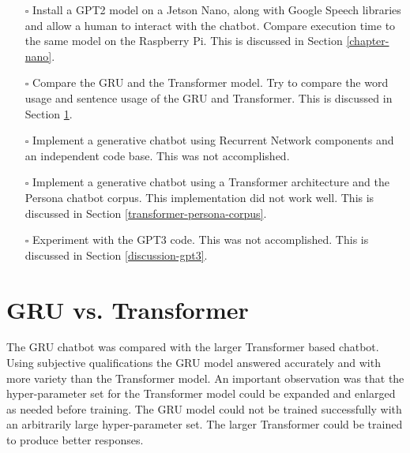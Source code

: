 \begin{itemize}
	\item[\rlap{\raisebox{0.3ex}{\hspace{0.4ex}\tiny \ding{52}}}$\square$] Install a GPT2 model on a Jetson Nano, along with Google Speech libraries and allow a human to interact with the chatbot. Compare execution time to the same model on the Raspberry Pi. This is discussed in Section \ref{chapter-nano}.
	
	\item[\rlap{\raisebox{0.3ex}{\hspace{0.4ex}\tiny \ding{52}}}$\square$] Compare the GRU and the Transformer model. Try to compare the word usage and sentence usage of the GRU and Transformer. This is discussed in Section \ref{gru-vs-transformer}.
	
	\item[\rlap{\raisebox{0.3ex}{\hspace{0.4ex}\scriptsize \ding{56}}}$\square$] Implement a generative chatbot using Recurrent Network components and an independent code base. This was not accomplished.
	
	\item[\rlap{\raisebox{0.3ex}{\hspace{0.4ex}\scriptsize \ding{56}}}$\square$] Implement a generative chatbot using a Transformer architecture and the Persona chatbot corpus. This implementation did not work well. This is discussed in Section \ref{transformer-persona-corpus}. %
	
	\item[\rlap{\raisebox{0.3ex}{\hspace{0.4ex}\scriptsize \ding{56}}}$\square$] Experiment with the GPT3 code. This was not accomplished. This is discussed in Section \ref{discussion-gpt3}.
\end{itemize}


\section{GRU vs. Transformer}
\label{gru-vs-transformer}

The GRU chatbot was compared with the larger Transformer based chatbot. Using subjective qualifications the GRU model answered accurately and with more variety than the Transformer model. An important observation was that the hyper-parameter set for the Transformer model could be expanded and enlarged as needed before training. The GRU model could not be trained successfully with an arbitrarily large hyper-parameter set. The larger Transformer could be trained to produce better responses.

